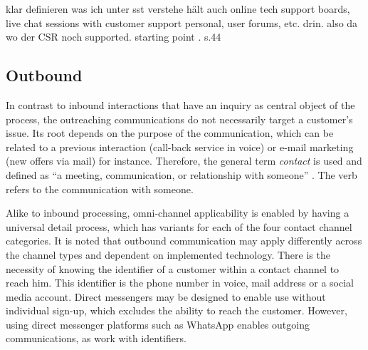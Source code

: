 	
	
	klar definieren was ich unter sst verstehe \citep{Thomas:2009} hält auch online tech support boards, live chat sessions with customer support personal, user forums, etc. drin. also da wo der CSR noch supported. 
	starting point \citep{Thomas:2009}.
		\citep{ccn2016} s.44
		
		

		\newpage
	\newpage
	
	\subsection{Outbound}
		
		In contrast to inbound interactions that have an inquiry as central object of the process, the outreaching communications do not necessarily target a customer's issue. Its root depends on the purpose of the communication, which can be related to a previous interaction (call-back service in voice) or e-mail marketing (new offers via mail) for instance. Therefore, the general term \textit{contact} is used and defined as \enquote{a meeting, communication, or relationship with someone} \citep{oxfordcontact}. The verb refers to the communication with someone.
		
		Alike to inbound processing, omni-channel applicability is enabled by having a universal detail process, which has variants for each of the four contact channel categories. It is noted that outbound communication may apply differently across the channel types and dependent on implemented technology. There is the necessity of knowing the identifier of a customer within a contact channel to reach him. This identifier is the phone number in voice, mail address or a social media account. Direct messengers may be designed to enable use without individual sign-up, which excludes the ability to reach the customer. However, using direct messenger platforms such as WhatsApp enables outgoing communications, as work with identifiers. 
		
